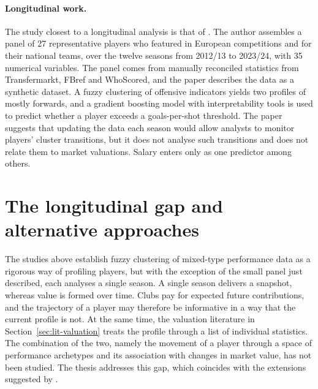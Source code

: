 \paragraph{Longitudinal work.} The study closest to a longitudinal analysis is that of . The author assembles a panel of 27 representative players who featured in European competitions and for their national teams, over the twelve seasons from 2012/13 to 2023/24, with 35 numerical variables. The panel comes from manually reconciled statistics from Transfermarkt, FBref and WhoScored, and the paper describes the data as a synthetic dataset. A fuzzy clustering of offensive indicators yields two profiles of mostly forwards, and a gradient boosting model with interpretability tools is used to predict whether a player exceeds a goals-per-shot threshold. The paper suggests that updating the data each season would allow analysts to monitor players' cluster transitions, but it does not analyse such transitions and does not relate them to market valuations. Salary enters only as one predictor among others.

\section{The longitudinal gap and alternative approaches}
\label{sec:lit-gap}

The studies above establish fuzzy clustering of mixed-type performance data as a rigorous way of profiling players, but with the exception of the small panel just described, each analyses a single season. A single season delivers a snapshot, whereas value is formed over time. Clubs pay for expected future contributions, and the trajectory of a player may therefore be informative in a way that the current profile is not. At the same time, the valuation literature in Section~\ref{sec:lit-valuation} treats the profile through a list of individual statistics. The combination of the two, namely the movement of a player through a space of performance archetypes and its association with changes in market value, has not been studied. The thesis addresses this gap, which coincides with the extensions suggested by .


